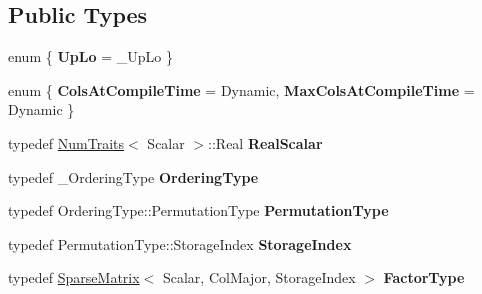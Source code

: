 \subsection*{Public Types}
\begin{DoxyCompactItemize}
\item 
\mbox{\label{class_eigen_1_1_incomplete_cholesky_abdfe91741c3ae75aba6fa91c9054e3dc}} 
enum \{ {\bfseries Up\+Lo} = \+\_\+\+Up\+Lo
 \}
\item 
\mbox{\label{class_eigen_1_1_incomplete_cholesky_a4ff61480412f2c64d1767356baafc809}} 
enum \{ {\bfseries Cols\+At\+Compile\+Time} = Dynamic, 
{\bfseries Max\+Cols\+At\+Compile\+Time} = Dynamic
 \}
\item 
\mbox{\label{class_eigen_1_1_incomplete_cholesky_ae906362ed4ef090681a625b30a8a2352}} 
typedef \mbox{\hyperlink{struct_eigen_1_1_num_traits}{Num\+Traits}}$<$ Scalar $>$\+::Real {\bfseries Real\+Scalar}
\item 
\mbox{\label{class_eigen_1_1_incomplete_cholesky_ac9632ffaca343c90320ca8cf58c76cb4}} 
typedef \+\_\+\+Ordering\+Type {\bfseries Ordering\+Type}
\item 
\mbox{\label{class_eigen_1_1_incomplete_cholesky_aa85d6c80b460b94f23b5da2a7169adbf}} 
typedef Ordering\+Type\+::\+Permutation\+Type {\bfseries Permutation\+Type}
\item 
\mbox{\label{class_eigen_1_1_incomplete_cholesky_a121d37da7609158f8c9d3645da0318cc}} 
typedef Permutation\+Type\+::\+Storage\+Index {\bfseries Storage\+Index}
\item 
\mbox{\label{class_eigen_1_1_incomplete_cholesky_a22b4aeb158ca4d5a5a276bd16dd1d1e1}} 
typedef \mbox{\hyperlink{class_eigen_1_1_sparse_matrix}{Sparse\+Matrix}}$<$ Scalar, Col\+Major, Storage\+Index $>$ {\bfseries Factor\+Type}
\item 
\mbox{\label{class_eigen_1_1_incomplete_cholesky_a559694dda108ecd08a5a6b8339d62446}} 

\end{DoxyCompactItemize}
